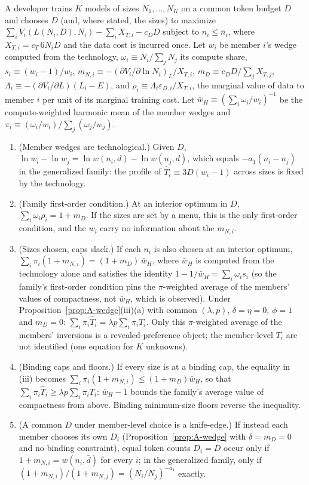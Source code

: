 \begin{proposition}\label{prop:A-family}
A developer trains $K$ models of sizes $N_1,\dots,N_K$ on a common token budget $D$ and chooses $D$ (and, where stated,
the sizes) to maximize $\sum_iV_i(L(N_i,D),N_i)-\sum_iX_{T,i}-c_DD$ subject to $n_i\le\bar n_i$, where
$X_{T,i}=c_T\,6N_iD$ and the data cost is incurred once. Let $w_i$ be member $i$'s wedge computed from the technology,
$\omega_i\equiv N_i/\sum_jN_j$ its compute share, $s_i\equiv(w_i-1)/w_i$, $m_{N,i}\equiv-(\partial V_i/\partial\ln N_i)_L/X_{T,i}$,
$m_D\equiv c_DD/\sum_jX_{T,j}$, $\Lambda_i\equiv-(\partial V_i/\partial L)(L_i-E)$, and
$\rho_i\equiv\Lambda_i\varepsilon_{D,i}/X_{T,i}$, the marginal value of data to member $i$ per unit of its marginal training
cost. Let $\bar w_H\equiv(\sum_i\omega_i/w_i)^{-1}$ be the compute-weighted harmonic mean of the member wedges and
$\pi_i\equiv(\omega_i/w_i)/\sum_j(\omega_j/w_j)$.
\begin{enumerate}
\item[(i)] (Member wedges are technological.) Given $D$, $\ln w_i-\ln w_j=\ln w(n_i,d)-\ln w(n_j,d)$, which equals
$-a_1(n_i-n_j)$ in the generalized family: the profile of $\hat T_i\equiv3D(w_i-1)$ across sizes is fixed by the
technology.
\item[(ii)] (Family first-order condition.) At an interior optimum in $D$, $\sum_i\omega_i\rho_i=1+m_D$. If the sizes are
set by a menu, this is the only first-order condition, and the $w_i$ carry no information about the $m_{N,i}$.
\item[(iii)] (Sizes chosen, caps slack.) If each $n_i$ is also chosen at an interior optimum,
$\sum_i\pi_i(1+m_{N,i})=(1+m_D)\,\bar w_H$, where $\bar w_H$ is computed from the technology alone and satisfies the
identity $1-1/\bar w_H=\sum_i\omega_is_i$ (so the family's first-order condition pins the $\pi$-weighted average of the
members' values of compactness, not $\bar w_H$, which is observed). Under
Proposition~\ref{prop:A-wedge}(iii)(a) with common $(\lambda,p)$, $\delta=\eta=0$, $\phi=1$ and $m_D=0$:
$\sum_i\pi_i\hat T_i=\lambda p\sum_i\pi_iT_i$. Only this $\pi$-weighted average of the members' inversions is a
revealed-preference object; the member-level $T_i$ are not identified (one equation for $K$ unknowns).
\item[(iv)] (Binding caps and floors.) If every size is at a binding cap, the equality in (iii) becomes
$\sum_i\pi_i(1+m_{N,i})\le(1+m_D)\bar w_H$, so that $\sum_i\pi_i\hat T_i\ge\lambda p\sum_i\pi_iT_i$: $\bar w_H-1$ bounds the
family's average value of compactness from above. Binding minimum-size floors reverse the inequality.
\item[(v)] (A common $D$ under member-level choice is a knife-edge.) If instead each member chooses its own $D_i$
(Proposition~\ref{prop:A-wedge} with $\delta=m_D=0$ and no binding constraint), equal token counts $D_i=\bar D$ occur only
if $1+m_{N,i}=w(n_i,\bar d)$ for every $i$; in the generalized family, only if
$(1+m_{N,i})/(1+m_{N,j})=(N_i/N_j)^{-a_1}$ exactly.
\end{enumerate}
\end{proposition}


